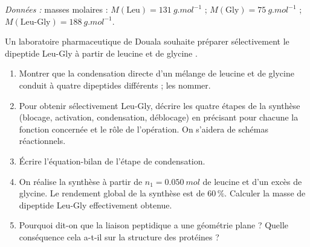 \documentclass[11pt]{article}
\begin{document}
\begin{exercice}
\emph{Données :} masses molaires : $M(\text{Leu}) = \SI{131}{g.mol^{-1}}$ ; $M(\text{Gly}) = \SI{75}{g.mol^{-1}}$ ; $M(\text{Leu-Gly}) = \SI{188}{g.mol^{-1}}$.

Un laboratoire pharmaceutique de Douala souhaite préparer sélectivement le dipeptide Leu-Gly à partir de leucine  et de glycine .
\begin{enumerate}
\item Montrer que la condensation directe d'un mélange de leucine et de glycine conduit à quatre dipeptides différents ; les nommer.
\item Pour obtenir sélectivement Leu-Gly, décrire les quatre étapes de la synthèse (blocage, activation, condensation, déblocage) en précisant pour chacune la fonction concernée et le rôle de l'opération. On s'aidera de schémas réactionnels.
\item Écrire l'équation-bilan de l'étape de condensation.
\item On réalise la synthèse à partir de $n_1 = \SI{0,050}{mol}$ de leucine et d'un excès de glycine. Le rendement global de la synthèse est de $60\,\%$. Calculer la masse de dipeptide Leu-Gly effectivement obtenue.
\item Pourquoi dit-on que la liaison peptidique a une géométrie plane ? Quelle conséquence cela a-t-il sur la structure des protéines ?
\end{enumerate}
\end{exercice}
\end{document}
